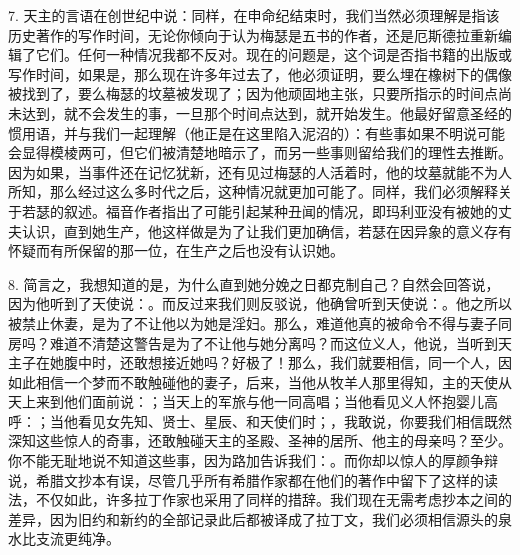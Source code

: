 7. 天主的言语在创世纪中说：\newline{}\newline{}同样，在申命纪结束时，\newline{}\newline{}\newline{}我们当然必须理解是指该历史著作的写作时间，无论你倾向于认为梅瑟是五书的作者，还是厄斯德拉重新编辑了它们。任何一种情况我都不反对。现在的问题是，这个词是否指书籍的出版或写作时间，如果是，那么现在许多年过去了，他必须证明，要么埋在橡树下的偶像被找到了，要么梅瑟的坟墓被发现了；因为他顽固地主张，只要所指示的时间点尚未达到，就不会发生的事，一旦那个时间点达到，就开始发生。他最好留意圣经的惯用语，并与我们一起理解（他正是在这里陷入泥沼的）：有些事如果不明说可能会显得模棱两可，但它们被清楚地暗示了，而另一些事则留给我们的理性去推断。因为如果，当事件还在记忆犹新，还有见过梅瑟的人活着时，他的坟墓就能不为人所知，那么经过这么多时代之后，这种情况就更加可能了。同样，我们必须解释关于若瑟的叙述。福音作者指出了可能引起某种丑闻的情况，即玛利亚没有被她的丈夫认识，直到她生产，他这样做是为了让我们更加确信，若瑟在因异象的意义存有怀疑而有所保留的那一位，在生产之后也没有认识她。\par

8. 简言之，我想知道的是，为什么直到她分娩之日都克制自己？自然会回答说，因为他听到了天使说：。而反过来我们则反驳说，他确曾听到天使说：。他之所以被禁止休妻，是为了不让他以为她是淫妇。那么，难道他真的被命令不得与妻子同房吗？难道不清楚这警告是为了不让他与她分离吗？而这位义人，他说，当听到天主子在她腹中时，还敢想接近她吗？好极了！那么，我们就要相信，同一个人，因如此相信一个梦而不敢触碰他的妻子，后来，当他从牧羊人那里得知，主的天使从天上来到他们面前说：；当天上的军旅与他一同高唱；当他看见义人怀抱婴儿高呼：；当他看见女先知、贤士、星辰、和天使们时；，我敢说，你要我们相信既然深知这些惊人的奇事，还敢触碰天主的圣殿、圣神的居所、他主的母亲吗？至少。你不能无耻地说不知道这些事，因为路加告诉我们：。而你却以惊人的厚颜争辩说，希腊文抄本有误，尽管几乎所有希腊作家都在他们的著作中留下了这样的读法，不仅如此，许多拉丁作家也采用了同样的措辞。我们现在无需考虑抄本之间的差异，因为旧约和新约的全部记录此后都被译成了拉丁文，我们必须相信源头的泉水比支流更纯净。\par

